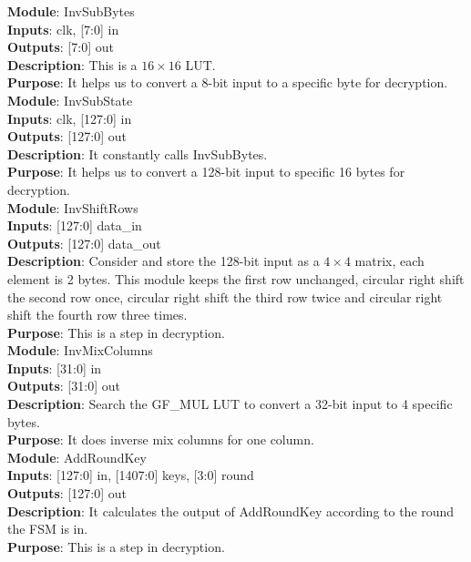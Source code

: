 \documentclass[12pt]{article}
\begin{document}
\textbf{Module}: InvSubBytes \\ 
\textbf{Inputs}: clk, [7:0] in \\ 
\textbf{Outputs}: [7:0] out \\
\textbf{Description}: This is a $16 \times 16$ LUT. \\ 
\textbf{Purpose}: It helps us to convert a 8-bit input to a specific byte for decryption. \\

\textbf{Module}: InvSubState \\ 
\textbf{Inputs}: clk, [127:0] in \\ 
\textbf{Outputs}: [127:0] out \\
\textbf{Description}: It constantly calls InvSubBytes. \\ 
\textbf{Purpose}: It helps us to convert a 128-bit input to specific 16 bytes for decryption. \\

\textbf{Module}: InvShiftRows \\ 
\textbf{Inputs}: [127:0] data\_in \\ 
\textbf{Outputs}: [127:0] data\_out \\
\textbf{Description}: Consider and store the 128-bit input as a $4 \times 4$ matrix, each element is 2 bytes. This module keeps the first row unchanged, circular right shift the second row once, circular right shift the third row twice and circular right shift the fourth row three times. \\ 
\textbf{Purpose}: This is a step in decryption. \\

\textbf{Module}: InvMixColumns \\ 
\textbf{Inputs}: [31:0] in \\ 
\textbf{Outputs}: [31:0] out \\
\textbf{Description}: Search the GF\_MUL LUT to convert a 32-bit input to 4 specific bytes. \\ 
\textbf{Purpose}: It does inverse mix columns for one column. \\

\textbf{Module}: AddRoundKey \\ 
\textbf{Inputs}: [127:0] in, [1407:0] keys, [3:0] round \\ 
\textbf{Outputs}: [127:0] out \\
\textbf{Description}: It calculates the output of AddRoundKey according to the round the FSM is in. \\ 
\textbf{Purpose}: This is a step in decryption. \\
\end{document}
